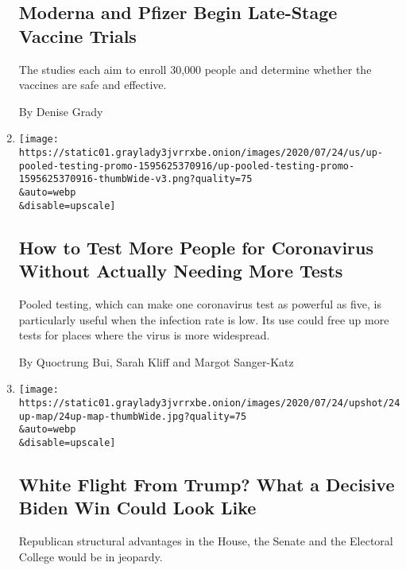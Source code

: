 \begin{enumerate}
{  \subsection{Moderna and Pfizer Begin Late-Stage Vaccine
  Trials}\label{moderna-and-pfizer-begin-late-stage-vaccine-trials}}

  The studies each aim to enroll 30,000 people and determine whether the
  vaccines are safe and effective.

  By Denise Grady
\item
  \href{/interactive/2020/07/27/upshot/coronavirus-pooled-testing.html}{}

  \texttt{[image: https://static01.graylady3jvrrxbe.onion/images/2020/07/24/us/up-pooled-testing-promo-1595625370916/up-pooled-testing-promo-1595625370916-thumbWide-v3.png?quality=75\\\&auto=webp\\\&disable=upscale]}

  \hypertarget{how-to-test-more-people-for-coronavirus-without-actually-needing-more-tests}{%
  \subsection{How to Test More People for Coronavirus Without Actually
  Needing More
  Tests}\label{how-to-test-more-people-for-coronavirus-without-actually-needing-more-tests}}

  Pooled testing, which can make one coronavirus test as powerful as
  five, is particularly useful when the infection rate is low. Its use
  could free up more tests for places where the virus is more
  widespread.

  By Quoctrung Bui, Sarah Kliff and Margot Sanger-Katz
\item
  \href{/2020/07/24/upshot/biden-polls-demographics.html}{}

  \texttt{[image: https://static01.graylady3jvrrxbe.onion/images/2020/07/24/upshot/24up-map/24up-map-thumbWide.jpg?quality=75\\\&auto=webp\\\&disable=upscale]}

  \hypertarget{white-flight-from-trump-what-a-decisive-biden-win-could-look-like}{%
  \subsection{White Flight From Trump? What a Decisive Biden Win Could
  Look
  Like}\label{white-flight-from-trump-what-a-decisive-biden-win-could-look-like}}

  Republican structural advantages in the House, the Senate and the
  Electoral College would be in jeopardy.


\end{enumerate}
